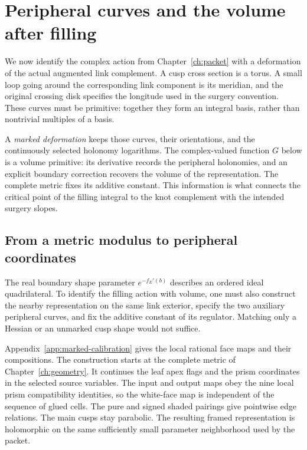 \chapter{Peripheral curves and the volume after filling}\label{ch:marked}

We now identify the complex action from Chapter~\ref{ch:packet} with a deformation of the actual augmented link complement. A cusp cross section is a torus. A small loop going around the corresponding link component is its meridian, and the original crossing disk specifies the longitude used in the surgery convention. These curves must be primitive: together they form an integral basis, rather than nontrivial multiples of a basis.

A \emph{marked deformation} keeps those curves, their orientations, and the continuously selected holonomy logarithms. The complex-valued function $G$ below is a volume primitive: its derivative records the peripheral holonomies, and an explicit boundary correction recovers the volume of the representation. The complete metric fixes its additive constant. This information is what connects the critical point of the filling integral to the knot complement with the intended surgery slopes.

\section{From a metric modulus to peripheral coordinates}
The real boundary shape parameter $e^{-f_E'(b)}$ describes an ordered ideal quadrilateral. To identify the filling action with volume, one must also construct the nearby representation on the same link exterior, specify the two auxiliary peripheral curves, and fix the additive constant of its regulator. Matching only a Hessian or an unmarked cusp shape would not suffice.

Appendix~\ref{app:marked-calibration} gives the local rational face maps and their compositions. The construction starts at the complete metric of Chapter~\ref{ch:geometry}. It continues the leaf apex flags and the prism coordinates in the selected source variables. The input and output maps obey the nine local prism compatibility identities, so the white-face map is independent of the sequence of glued cells. The pure and signed shaded pairings give pointwise edge relations. The main cusps stay parabolic. The resulting framed representation is holomorphic on the same sufficiently small parameter neighborhood used by the packet.

